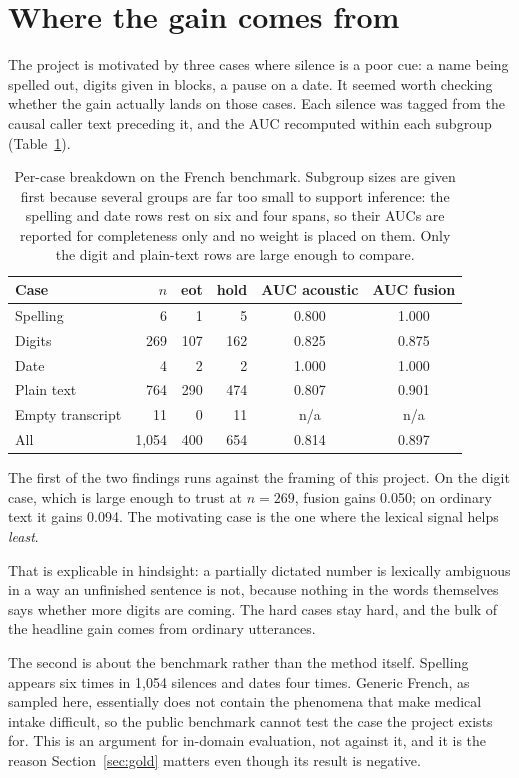 \section{Where the gain comes from}
\label{sec:hardcase}

The project is motivated by three cases where silence is a poor cue: a name being spelled
out, digits given in blocks, a pause on a date. It seemed worth checking whether the gain
actually lands on those cases. Each silence was tagged from the causal caller text preceding it, and the AUC recomputed
within each subgroup (Table~\ref{tab:hardcase}).

\begin{table}[H]
\centering
\caption[Per-case breakdown]{Per-case breakdown on the French benchmark. Subgroup sizes
are given first because several groups are far too small to support inference: the spelling
and date rows rest on six and four spans, so their AUCs are reported for completeness only
and no weight is placed on them. Only the digit and plain-text rows are large enough to
compare.}
\label{tab:hardcase}
\begin{tabular}{@{}lrrrcc@{}}
\toprule
Case & $n$ & eot & hold & AUC acoustic & AUC fusion \\
\midrule
Spelling & 6 & 1 & 5 & 0.800 & 1.000 \\
Digits & 269 & 107 & 162 & 0.825 & 0.875 \\
Date & 4 & 2 & 2 & 1.000 & 1.000 \\
Plain text & 764 & 290 & 474 & 0.807 & 0.901 \\
Empty transcript & 11 & 0 & 11 & n/a & n/a \\
\midrule
All & 1{,}054 & 400 & 654 & 0.814 & 0.897 \\
\bottomrule
\end{tabular}
\end{table}

The first of the two findings runs against the framing of this project. On the digit case, which is large
enough to trust at $n = 269$, fusion gains 0.050; on ordinary text it gains 0.094. The motivating case is the one where the lexical signal helps \emph{least}.

That is explicable in hindsight: a partially dictated number is lexically ambiguous in a way an
unfinished sentence is not, because nothing in the words themselves says whether more
digits are coming. The hard cases stay hard, and the bulk of the headline gain comes from
ordinary utterances.

The second is about the benchmark rather than the method itself. Spelling appears six times in
1{,}054 silences and dates four times. Generic French, as sampled here, essentially does not
contain the phenomena that make medical intake difficult, so the public benchmark cannot
test the case the project exists for. This is an argument for in-domain evaluation, not
against it, and it is the reason Section~\ref{sec:gold} matters even though its result is
negative.

